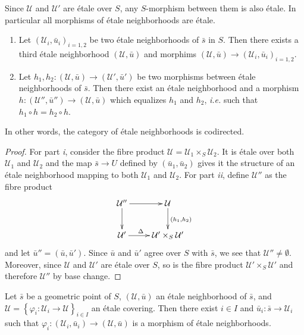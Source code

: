 \begin{remark}
\label{remark-etale-between-etale}
Since $\mathcal{U}$ and $\mathcal{U}'$ are \'etale over $S$, any $S$-morphism 
between them is also \'etale. In particular all morphisms of \'etale 
neighborhoods are \'etale.
\end{remark}

\begin{lemma}
\label{lemma-cofinal-etale}
\begin{enumerate}
\item Let $(\mathcal{U}_i, \bar u_i)_{i=1, 2}$ be two \'etale neighborhoods of 
$\bar s$ in $S$. Then there exists a third \'etale neighborhood $(\mathcal{U}, 
\bar u)$ and morphims $(\mathcal{U}, \bar u) \to (\mathcal{U}_i, \bar 
u_i)_{i=1,2}$.
\item Let $h_1, h_2: (\mathcal{U}, \bar u) \to (\mathcal{U}', \bar u')$ be two 
morphisms between \'etale neighborhoods of $\bar s$. Then there exist an 
\'etale neighborhood and a morphism $h : (\mathcal{U}'', \bar u'')\to 
(\mathcal{U}, \bar u)$ which equalizes $h_1$ and $h_2$, {\it i.e.}  such that 
$h_1\circ h = h_2\circ h$.		
\end{enumerate}
\end{lemma}

\noindent
In other words, the category of \'etale neighborhoods is codirected.

\begin{proof}
For part {\it i}, consider the fibre product $\mathcal{U} = \mathcal{U}_1 
\times_S \mathcal{U}_2$. It is \'etale over both $\mathcal{U}_1$ and 
$\mathcal{U}_2$ and the map $\bar s \to U$ defined by $(\bar u_1, \bar u_2)$ 
gives it the structure of an \'etale neighborhood mapping to both 
$\mathcal{U}_1$ and $\mathcal{U}_2$. For part {\it ii}, define $\mathcal{U}''$ 
as the fibre product 
$$
\xymatrix{
{\mathcal{U}''} \ar[r] \ar[d] & {\mathcal{U}} \ar^{(h_1,h_2)}[d] \\
{\mathcal{U}'} \ar^{\Delta \quad}[r] & {\mathcal{U}' \times_S \mathcal{U}'}
}
$$
and let $\bar u'' = (\bar u, \bar u')$. Since $\bar u$ and $\bar u'$ agree over 
$S$ with $\bar s$, we see that $\mathcal{U}''\neq\emptyset$. Moreover, since 
$\mathcal{U}$ and $\mathcal{U}'$ are \'etale over $S$, so is the fibre product 
$\mathcal{U}'\times_S \mathcal{U}'$ and therefore $\mathcal{U}''$ by base 
change.
\end{proof}

\begin{lemma}
\label{lemma-geometric-lift-to-cover}
Let $\bar s$ be a geometric point of $S$, $(\mathcal{U}, \bar u)$ an \'etale 
neighborhood of $\bar s$, and $\mathcal{U} = \left\{\varphi_i : \mathcal{U}_i 
\to \mathcal{U} \right\}_{i\in I}$ an \'etale covering. Then there exist $i\in 
I$ and $\bar u_i: \bar s  \to \mathcal{U}_i$ such that $\varphi_i: 
(\mathcal{U}_i, \bar u_i) \to (\mathcal{U}, \bar u)$ is a morphism of \'etale 
neighborhoods.  
\end{lemma}

